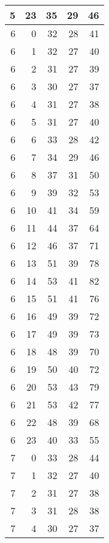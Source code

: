\begin{longtable}{|r|r|r|r|r|}
    5     & 23    & 35    & 29    & 46 \\\hline
    6     & 0     & 32    & 28    & 41 \\\hline
    6     & 1     & 32    & 27    & 40 \\\hline
    6     & 2     & 31    & 27    & 39 \\\hline
    6     & 3     & 30    & 27    & 37 \\\hline
    6     & 4     & 31    & 27    & 38 \\\hline
    6     & 5     & 31    & 27    & 40 \\\hline
    6     & 6     & 33    & 28    & 42 \\\hline
    6     & 7     & 34    & 29    & 46 \\\hline
    6     & 8     & 37    & 31    & 50 \\\hline
    6     & 9     & 39    & 32    & 53 \\\hline
    6     & 10    & 41    & 34    & 59 \\\hline
    6     & 11    & 44    & 37    & 64 \\\hline
    6     & 12    & 46    & 37    & 71 \\\hline
    6     & 13    & 51    & 39    & 78 \\\hline
    6     & 14    & 53    & 41    & 82 \\\hline
    6     & 15    & 51    & 41    & 76 \\\hline
    6     & 16    & 49    & 39    & 72 \\\hline
    6     & 17    & 49    & 39    & 73 \\\hline
    6     & 18    & 48    & 39    & 70 \\\hline
    6     & 19    & 50    & 40    & 72 \\\hline
    6     & 20    & 53    & 43    & 79 \\\hline
    6     & 21    & 53    & 42    & 77 \\\hline
    6     & 22    & 48    & 39    & 68 \\\hline
    6     & 23    & 40    & 33    & 55 \\\hline
    7     & 0     & 33    & 28    & 44 \\\hline
    7     & 1     & 32    & 27    & 40 \\\hline
    7     & 2     & 31    & 27    & 38 \\\hline
    7     & 3     & 31    & 28    & 38 \\\hline
    7     & 4     & 30    & 27    & 37 \\\hline

\end{longtable}
